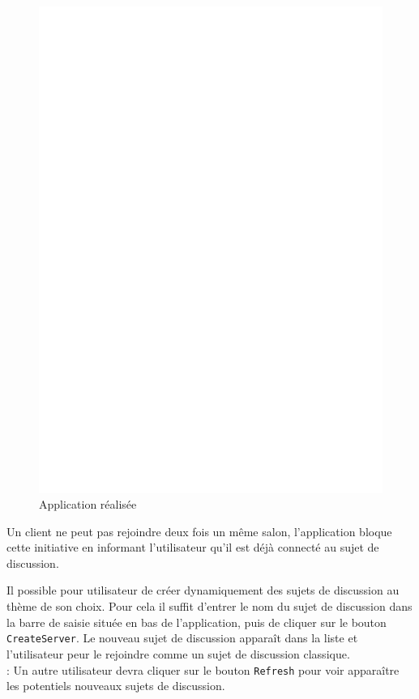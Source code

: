 \documentclass[12pt]{article}
\begin{document}
\begin{figure}[htb]
  \includegraphics[scale=.3]{img/dia.eps}
  \caption{Application réalisée}
  \label{fig:dia}
\end{figure}

Un client ne peut pas rejoindre deux fois un même salon, l'application bloque cette initiative en informant l'utilisateur qu'il est déjà connecté au sujet de discussion.

Il possible pour utilisateur de créer dynamiquement des sujets de discussion au thème de son choix. Pour cela il suffit d'entrer le nom du sujet de discussion dans la barre de saisie située en bas de l'application, puis de cliquer sur le bouton \verb+CreateServer+. Le nouveau sujet de discussion apparaît dans la liste et l'utilisateur peur le rejoindre comme un sujet de discussion classique. 
\hfill \\
\hspace{4cm} \danger : Un autre utilisateur devra cliquer sur le bouton \verb+Refresh+ pour voir apparaître les potentiels nouveaux sujets de discussion.
\end{document}
